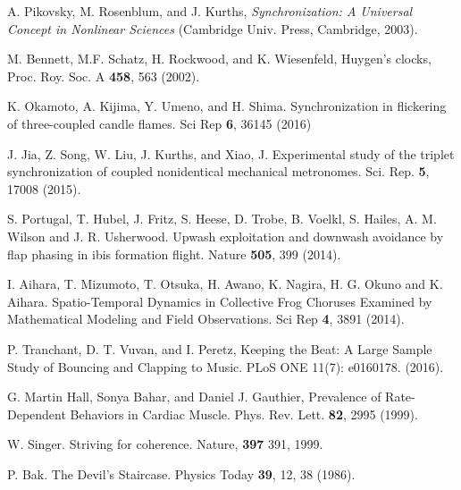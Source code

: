 \documentclass[twocolumn,preprintnumbers,amsmath,amssymb,aps,prx]{revtex4}
\begin{document}
\begin{thebibliography}{99}

 A. Pikovsky, M. Rosenblum, and J. Kurths, {\it Synchronization: A Universal Concept in Nonlinear Sciences} (Cambridge Univ. Press, Cambridge, 2003).
  
 M. Bennett, M.F. Schatz, H. Rockwood, and K. Wiesenfeld, Huygen's clocks, Proc. Roy. Soc. A {\bf 458}, 563 (2002).
  
 K. Okamoto, A. Kijima, Y. Umeno, and H. Shima. Synchronization in flickering of three-coupled candle flames. Sci Rep {\bf 6}, 36145 (2016)

  J. Jia, Z. Song, W. Liu, J. Kurths, and Xiao, J. Experimental study of the triplet synchronization of coupled nonidentical mechanical metronomes. Sci. Rep. {\bf 5}, 17008 (2015).

  
 S. Portugal, T. Hubel, J. Fritz, S. Heese, D. Trobe, B. Voelkl, S. Hailes, A. M. Wilson and J. R. Usherwood.  Upwash exploitation and downwash avoidance by flap phasing in ibis formation flight. Nature {\bf 505}, 399 (2014).

   I. Aihara, T. Mizumoto, T. Otsuka, H. Awano, K. Nagira, H. G. Okuno and K. Aihara. Spatio-Temporal Dynamics in Collective Frog Choruses Examined by Mathematical Modeling and Field Observations. Sci Rep {\bf 4}, 3891 (2014). 

   P. Tranchant, D. T. Vuvan, and I. Peretz, Keeping the Beat: A Large Sample Study of Bouncing and Clapping to Music. PLoS ONE 11(7): e0160178. (2016).

   G. Martin Hall, Sonya Bahar, and Daniel J. Gauthier, Prevalence of Rate-Dependent Behaviors in Cardiac Muscle. Phys. Rev. Lett. {\bf 82}, 2995 (1999).

   W. Singer. Striving for coherence. Nature, {\bf 397} 391, 1999.

     P. Bak. The Devil's Staircase. Physics Today {\bf 39}, 12, 38 (1986).


\end{thebibliography}
\end{document}
